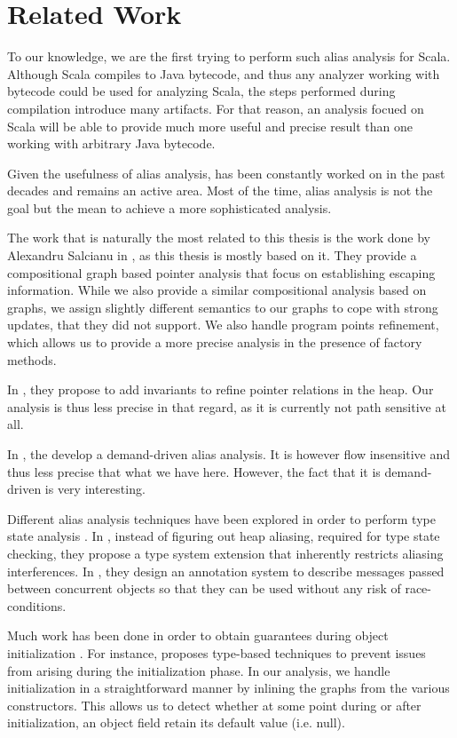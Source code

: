 \chapter{Related Work}
\label{chap:related}
To our knowledge, we are the first trying to perform such alias analysis for
Scala. Although Scala compiles to Java bytecode, and thus any analyzer working
with bytecode could be used for analyzing Scala, the steps performed during
compilation introduce many artifacts. For that reason, an analysis focued on
Scala will be able to provide much more useful and precise result than one
working with arbitrary Java bytecode.

Given the usefulness of alias analysis, has been constantly worked on in the
past decades and remains an active area. Most of the time, alias analysis is not
the goal but the mean to achieve a more sophisticated analysis.

The work that is naturally the most related to this thesis is the work done by
Alexandru Salcianu in \cite{Salcianu2001,Salcianu2006}, as this thesis is
mostly based on it. They provide a compositional graph based pointer analysis
that focus on establishing escaping information. While we also provide a
similar compositional analysis based on graphs, we assign slightly different
semantics to our graphs to cope with strong updates, that they did not support.
We also handle program points refinement, which allows us to provide a more
precise analysis in the presence of factory methods.

In \cite{DBLP:conf/oopsla/DilligDA10}, they propose to add invariants to
refine pointer relations in the heap. Our analysis is thus less precise in
that regard, as it is currently not path sensitive at all.

In \cite{DBLP:conf/ecoop/ChalinJ07}, the develop a demand-driven alias
analysis. It is however flow insensitive and thus less precise that what we
have here. However, the fact that it is demand-driven is very interesting.

Different alias analysis techniques have been explored in order to perform type
state analysis \cite{DBLP:journals/tse/StromY86, DBLP:journals/tse/StromY93}.
In \cite{DBLP:conf/pldi/FahndrichD02}, instead of figuring out heap aliasing,
required for type state checking, they propose a type system extension that
inherently restricts aliasing interferences. In
\cite{DBLP:conf/ecoop/HallerO10}, they design an annotation system to describe
messages passed between concurrent objects so that they can be used
without any risk of race-conditions.

Much work has been done in order to obtain guarantees during object
initialization
\cite{DBLP:conf/popl/QiM09,DBLP:conf/oopsla/FahndrichX07,DBLP:conf/ecoop/ChalinJ07}.
For instance, \cite{DBLP:conf/oopsla/FahndrichX07} proposes type-based
techniques to prevent issues from arising during the initialization phase. In
our analysis, we handle initialization in a straightforward manner by inlining
the graphs from the various constructors. This allows us to detect whether at
some point during or after initialization, an object field retain its default
value (i.e.  null).
